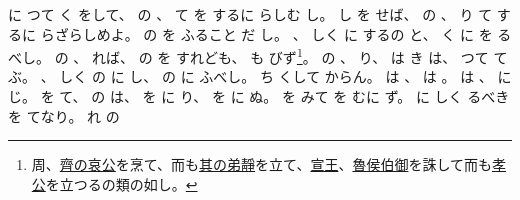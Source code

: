 \documentclass[a4paper,12pt]{article}
\begin{document}
\begin{quoting}
に%
つて%
く%
をして、%
の%
、%
て%
を%
するに%
らしむ%
し。%
し%
を%
せば、%
の%
、%
り%
て%
す%
るに%
らざらしめよ。%
の%
を%
ふること%
だ%
し。%
、%
しく%
に%
するの%
と、%
く%
に%
を%
るべし。%
の%
、%
%
れば、%
の%
を%
すれども、%
も%
%
びず\footnote{周、\href{https://ja.wikipedia.org/wiki/\%E5\%93\%80\%E5\%85\%AC_(\%E6\%96\%89)}{齊の哀公}を烹て、而も\href{https://ja.wikipedia.org/wiki/\%E8\%83\%A1\%E5\%85\%AC_(\%E6\%96\%89)}{其の弟靜}を立て、\href{https://ja.wikipedia.org/wiki/\%E5\%AE\%A3\%E7\%8E\%8B_(\%E5\%91\%A8)}{宣王}、\href{https://ja.wikipedia.org/wiki/\%E5\%BB\%83\%E5\%85\%AC_(\%E9\%AD\%AF)}{魯侯伯御}を誅して而も\href{https://ja.wikipedia.org/wiki/\%E5\%AD\%9D\%E5\%85\%AC_(\%E9\%AD\%AF)}{孝公}を立つるの類の如し。}。%
の%
、%
%
り、%
は%
%
き%
は、%
%
つて%
て%
ぶ。%
、%
しく%
の%
に%
し、%
の%
に%
ふべし。%
ち%
%
くして%
%
からん。%
は%
、%
は%
。%
は%
、%
に%
じ。%
を%
て、%
の%
は、%
を%
に%
り、%
を%
に%
ぬ。%
を%
みて%
を%
むに%
ず。%
に%
%
しく%
るべきを%
てなり。%
れ%
の%

\end{quoting}
\end{document}
